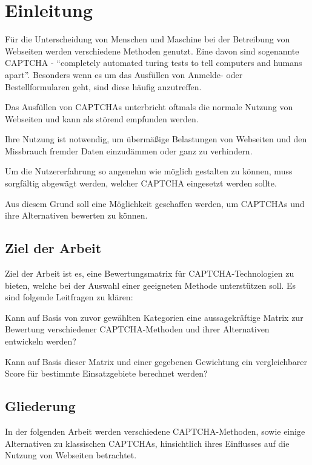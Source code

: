\chapter{Einleitung}
\label{ch:intro}

Für die Unterscheidung von Menschen und Maschine bei der Betreibung von Webseiten werden verschiedene Methoden genutzt.
Eine davon sind sogenannte CAPTCHA - ``completely automated turing tests to tell computers and humans apart''.
Besonders wenn es um das Ausfüllen von Anmelde- oder Bestellformularen geht, sind diese häufig anzutreffen.

Das Ausfüllen von CAPTCHAs unterbricht oftmals die normale Nutzung von Webseiten und kann als störend empfunden werden.

Ihre Nutzung ist notwendig, um übermäßige Belastungen von Webseiten und den Missbrauch fremder Daten einzudämmen oder ganz zu verhindern.

Um die Nutzererfahrung so angenehm wie möglich gestalten zu können,
muss sorgfältig abgewägt werden, welcher CAPTCHA eingesetzt werden sollte. 

Aus diesem Grund soll eine Möglichkeit geschaffen werden, um CAPTCHAs und ihre Alternativen bewerten zu können.


%
%
\section{Ziel der Arbeit}
\label{sec:intro:goal}

Ziel der Arbeit ist es, eine Bewertungsmatrix für CAPTCHA-Technologien zu bieten, welche bei der Auswahl einer geeigneten Methode unterstützen soll.
Es sind folgende Leitfragen zu klären:

Kann auf Basis von zuvor gewählten Kategorien eine aussagekräftige Matrix zur
Bewertung verschiedener CAPTCHA-Methoden und ihrer Alternativen entwickeln werden?

Kann auf Basis dieser Matrix und einer gegebenen Gewichtung
ein vergleichbarer Score für bestimmte Einsatzgebiete berechnet werden?

%
%
\section{Gliederung}
\label{sec:intro:structure}
In der folgenden Arbeit werden verschiedene CAPTCHA-Methoden, sowie einige Alternativen zu klassischen CAPTCHAs,
hinsichtlich ihres Einflusses auf die Nutzung von Webseiten betrachtet.

